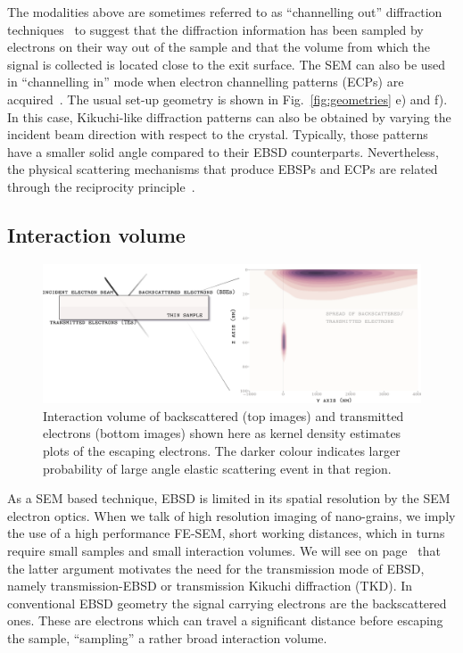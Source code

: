 The modalities above are sometimes referred to as ``channelling out'' diffraction techniques~\cite{joy1994} to suggest that the diffraction information has been sampled by electrons on their way out of the sample and that the volume from which the signal is collected is located close to the exit surface. The SEM can also be used in ``channelling in'' mode when electron channelling patterns (ECPs) are acquired~\cite{Coates67,Joy82}. The usual set-up  geometry is shown in Fig.~\ref{fig:geometries} e) and f). In this case, Kikuchi-like diffraction patterns can also be obtained by varying the incident beam direction with respect to the crystal. Typically, those patterns have a smaller solid angle compared to their EBSD counterparts. Nevertheless, the physical scattering mechanisms that produce EBSPs and ECPs are related through the reciprocity principle~\cite{reimerSEM}.

\subsection{Interaction volume}


\begin{figure}
\centering
\includegraphics[width=0.9\linewidth]{Figures/TKDpendepth.png}
\caption[Interaction volume]{Interaction volume of backscattered (top images) and transmitted electrons (bottom images) shown here as kernel density estimates plots of the escaping electrons. The darker colour indicates larger probability of large angle elastic scattering event in that region.}
\label{fig:intvolume}
\end{figure}



As a SEM based technique, EBSD is limited in its spatial resolution by the SEM electron optics. When we talk of high resolution imaging of nano-grains, we imply the use of a high performance FE-SEM, short working distances, which in turns require small samples and small interaction volumes. We will see on page~\pageref{sec:motivation} that the latter argument motivates the need for the transmission mode of EBSD, namely transmission-EBSD or transmission Kikuchi diffraction (TKD). In conventional EBSD geometry the signal carrying electrons are the backscattered ones. These are electrons which can travel a significant distance before escaping the sample, ``sampling'' a rather broad interaction volume. 



